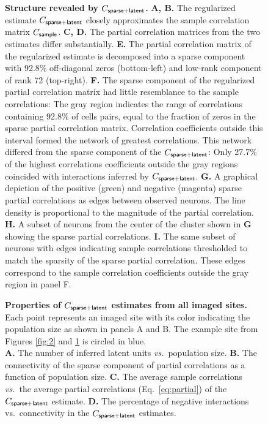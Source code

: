 \begin{figure}
\caption{{\bf Structure revealed by $C_{\sf sparse+latent}$.}
{\bf A, B.} The regularized estimate $C_{\sf sparse+latent}$ closely approximates the sample correlation matrix $C_{\sf sample}$.
{\bf C, D.} The partial correlation matrices from the two estimates differ substantially.
{\bf E.} The partial correlation matrix of the regularized estimate is decomposed into a sparse component with 92.8\% off-diagonal zeros (bottom-left) and low-rank component of rank 72 (top-right).
{\bf F.} The sparse component of the regularized partial correlation matrix had little resemblance to the sample correlations: The gray region indicates the range of correlations containing 92.8\% of cells pairs, equal to the fraction of zeros in the sparse partial correlation matrix. Correlation coefficients outside this interval formed the network of greatest correlations.  This network differed from the sparse component of the $C_{\sf sparse+latent}$:  Only 27.7\% of the highest correlations coefficients outside the gray regions coincided with interactions inferred by $C_{\sf sparse+latent}$.
{\bf G.} A graphical depiction of the positive (green) and negative (magenta) sparse partial correlations as edges between observed neurons. The line density is proportional to the magnitude of the partial correlation.
{\bf H.} A subset of neurons from the center of the cluster shown in {\bf G} showing the sparse partial correlations.
{\bf I.} The same subset of neurons with edges indicating sample correlations thresholded to match the sparsity of the sparse partial correlation. These edges correspond to the sample correlation coefficients outside the gray region in panel F.
}
\label{fig:4}
\end{figure}
 
\begin{figure}
\caption{{\bf Properties of $C_{\sf sparse+latent}$ estimates from all imaged sites.}
Each point represents an imaged site with its color indicating the population size as shown in panels A and B. The example site from Figures \ref{fig:2} and \ref{fig:4} is circled in blue.
\\
{\bf A.} The number of inferred latent units \emph{vs.}~population size.
{\bf B.} The connectivity of the sparse component of partial correlations as a function of population size.
{\bf C.} The average sample correlations \emph{vs.}~the average partial correlations (Eq.~\ref{eq:partial}) of the $C_{\sf sparse+latent}$ estimate.
{\bf D.} The percentage of negative interactions vs.~connectivity in the $C_{\sf sparse+latent}$ estimates.
}
\label{fig:5}
\end{figure}


